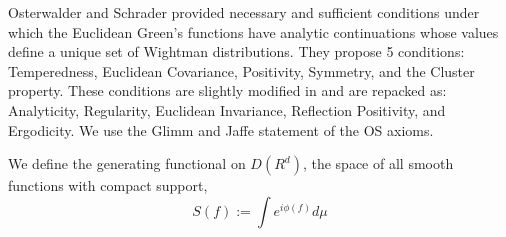 \documentclass{article}
\begin{document}
Osterwalder and Schrader \cite{OS1973}  provided necessary and sufficient conditions under which the Euclidean Green's functions have analytic continuations whose values define a unique set of Wightman distributions. They propose 5 conditions: Temperedness, Euclidean Covariance, Positivity, Symmetry, and the Cluster property. These conditions are slightly modified in \cite{GJ1987Axioms} and are repacked as: Analyticity, Regularity, Euclidean Invariance, Reflection Positivity, and Ergodicity. We use the Glimm and Jaffe statement of the OS axioms.  

We define the generating functional on $D(R^d)$, the space of all smooth functions with compact support, 
\begin{equation} \label{eq:genfn}
    S(f):= \int e^{i \phi(f) } d \mu
\end{equation}
\end{document}
